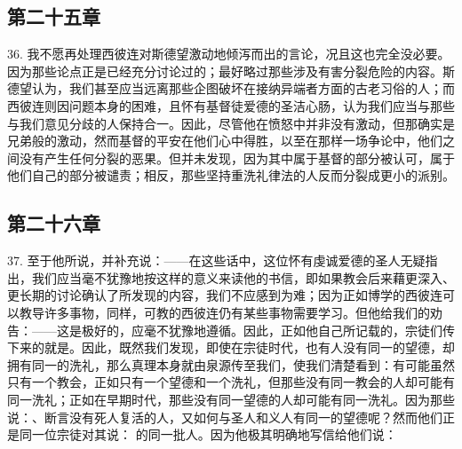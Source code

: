 
\subsection{第二十五章}

36. 我不愿再处理西彼连对斯德望激动地倾泻而出的言论，况且这也完全没必要。因为那些论点正是已经充分讨论过的；最好略过那些涉及有害分裂危险的内容。斯德望认为，我们甚至应当远离那些企图破坏在接纳异端者方面的古老习俗的人；而西彼连则因问题本身的困难，且怀有基督徒爱德的圣洁心肠，认为我们应当与那些与我们意见分歧的人保持合一。因此，尽管他在愤怒中并非没有激动，但那确实是兄弟般的激动，然而基督的平安在他们心中得胜，以至在那样一场争论中，他们之间没有产生任何分裂的恶果。但并未发现，因为其中属于基督的部分被认可，属于他们自己的部分被谴责；相反，那些坚持重洗礼律法的人反而分裂成更小的派别。\par


\subsection{第二十六章}

37. 至于他所说，并补充说：——在这些话中，这位怀有虔诚爱德的圣人无疑指出，我们应当毫不犹豫地按这样的意义来读他的书信，即如果教会后来藉更深入、更长期的讨论确认了所发现的内容，我们不应感到为难；因为正如博学的西彼连可以教导许多事物，同样，可教的西彼连仍有某些事物需要学习。但他给我们的劝告：——这是极好的，应毫不犹豫地遵循。因此，正如他自己所记载的，宗徒们传下来的就是。因此，既然我们发现，即使在宗徒时代，也有人没有同一的望德，却拥有同一的洗礼，那么真理本身就由泉源传至我们，使我们清楚看到：有可能虽然只有一个教会，正如只有一个望德和一个洗礼，但那些没有同一教会的人却可能有同一洗礼；正如在早期时代，那些没有同一望德的人却可能有同一洗礼。因为那些说：、断言没有死人复活的人，又如何与圣人和义人有同一的望德呢？然而他们正是同一位宗徒对其说： 的同一批人。因为他极其明确地写信给他们说：\par

